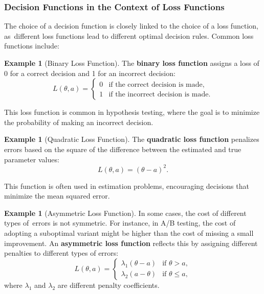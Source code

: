 \documentclass[magisterska, english]{pwr_wmat_praca_dyplomowa}
\theoremstyle{plain}
\numberwithin{theorem}{chapter}
\theoremstyle{definition}
\numberwithin{theorem}{chapter}
\newtheorem{example}[theorem]{Example}
\begin{document}
\subsubsection{Decision Functions in the Context of Loss Functions}

The choice of a decision function is closely linked to the choice of a loss function, as~different loss functions lead to different optimal decision rules. Common loss functions include:

\begin{example}[Binary Loss Function]
	The \textbf{binary loss function} assigns a loss of 0 for a correct decision and 1 for an incorrect decision:
	\[
	L(\theta, a) = 
	\begin{cases} 
		0 & \text{if the correct decision is made}, \\
		1 & \text{if the incorrect decision is made}.
	\end{cases}
	\]
\end{example}

This loss function is common in hypothesis testing, where the goal is to minimize the probability of making an incorrect decision.

\begin{example}[Quadratic Loss Function]
	The \textbf{quadratic loss function} penalizes errors based on the square of the difference between the estimated and true parameter values:
	\[
	L(\theta, a) = (\theta - a)^2.
	\]
\end{example}

This function is often used in estimation problems, encouraging decisions that minimize the mean squared error.

\begin{example}[Asymmetric Loss Function]
	In some cases, the cost of different types of~errors is not symmetric. For instance, in A/B testing, the cost of adopting a suboptimal variant might be higher than the cost of missing a small improvement. An \textbf{asymmetric loss function} reflects this by assigning different penalties to different types of errors:
	\[
	L(\theta, a) = 
	\begin{cases} 
		\lambda_1(\theta - a) & \text{if } \theta > a, \\
		\lambda_2(a - \theta) & \text{if } \theta \leq a,
	\end{cases}
	\]
	where \( \lambda_1 \) and \( \lambda_2 \) are different penalty coefficients.
\end{example}
\end{document}
